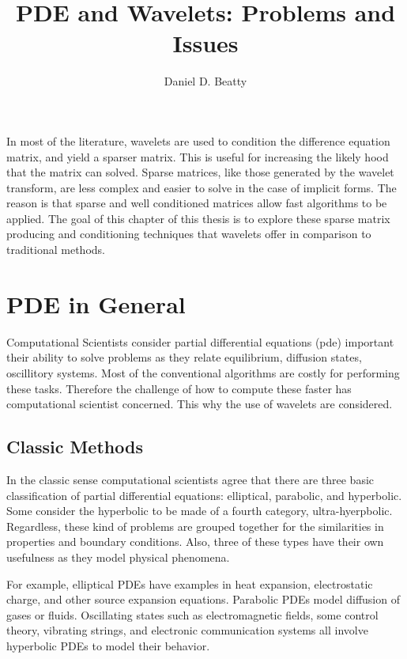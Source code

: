 \documentclass[11pt]{article}
\title{PDE and Wavelets: Problems and Issues}
\author{Daniel D. Beatty}
\begin{document}
\maketitle

\bigskip
\tableofcontents
\newpage

In most of the literature, wavelets are used to condition the difference equation matrix, and yield a %
sparser matrix.  This is useful %
for increasing the likely hood that the matrix can solved.  %
Sparse matrices, like those generated by the wavelet transform, are less complex and easier to solve in the case of implicit forms.  %
The reason is that sparse and well conditioned matrices allow fast algorithms to be applied.
The goal of this chapter of this thesis is to explore these %
sparse matrix producing  and conditioning techniques that wavelets offer in comparison to traditional methods.  

\section {PDE in General}
Computational Scientists consider partial differential equations (pde) important their ability to solve problems as they relate equilibrium, diffusion states, oscillitory systems.  Most of the conventional algorithms are costly for performing these tasks.  Therefore the challenge of how to compute these faster has computational scientist concerned.  This why the use of wavelets are considered.  


\subsection {Classic Methods}
In the classic sense computational scientists agree that there are three basic classification of partial differential equations: elliptical, parabolic, and hyperbolic.  Some consider the hyperbolic to be made of a fourth category, ultra-hyerpbolic.  Regardless, these kind of problems are grouped together for the similarities in properties and boundary conditions. %
Also, three of these types have their own usefulness as they model physical phenomena.  

For example, elliptical PDEs have examples in heat expansion, electrostatic charge, and other source expansion equations.  Parabolic PDEs model diffusion of gases or fluids.  Oscillating states such as electromagnetic fields, some control theory, vibrating strings, and electronic communication systems all involve hyperbolic PDEs to model their behavior.  
\end{document}

